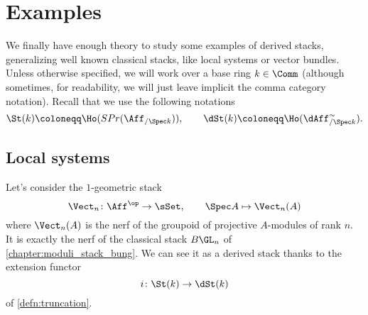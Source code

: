 \chapter{Examples}
    \label{chapter:examples}
    We finally have enough theory to study some examples of derived stacks, generalizing well known classical stacks, like local systems or vector bundles. Unless otherwise specified, we will work over a base ring $k \in \Comm$ (although sometimes, for readability, we will just leave implicit the comma category notation). Recall that we use the following notations \[\St(k) \coloneqq \Ho(SPr(\Aff_{/\Spec k})), \qquad \dSt(k) \coloneqq \Ho(\dAff_{/\Spec k}^{\sim}). \]
    \section{Local systems}
        Let's consider the $1$-geometric stack \[ \Vect_n\colon \Aff^{\op} \to \sSet, \qquad \Spec A \mapsto \Vect_n(A)\] where $\Vect_n(A)$ is the nerf of the groupoid of projective $A$-modules of rank $n$. It is exactly the nerf of the classical stack $B\GL_n$ of \cref{chapter:moduli_stack_bung}.
        We can see it as a derived stack thanks to the extension functor \[i\colon \St(k) \to \dSt(k) \] of \cref{defn:truncation}.

